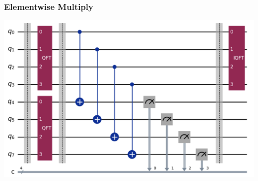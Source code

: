 \documentclass[
	11pt, %
]{beamer}
\begin{document}
\begin{frame}
    \frametitle{Elementwise Multiply}
    \begin{center}
        \includegraphics[scale=0.28]{elementwise.png}
    \end{center}
\end{frame}


\end{document}
